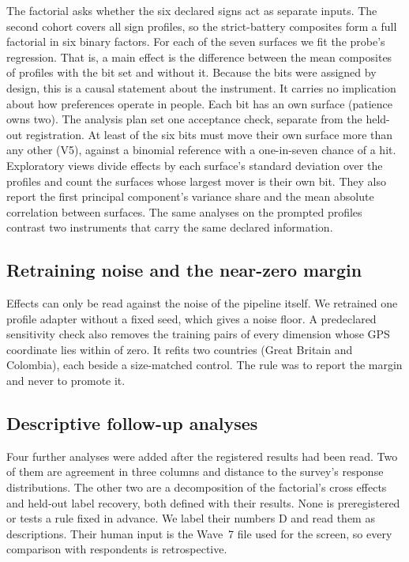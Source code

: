 The factorial asks whether the six declared signs act as separate inputs. The second cohort covers all  sign profiles, so the strict-battery composites form a full factorial in six binary factors. For each of the seven surfaces we fit the probe's regression. That is, a main effect is the difference between the mean composites of profiles with the bit set and without it. Because the bits were assigned by design, this is a causal statement about the instrument. It carries no implication about how preferences operate in people. Each bit has an own surface (patience owns two). The analysis plan set one acceptance check, separate from the held-out registration. At least  of the six bits must move their own surface more than any other (V5), against a binomial reference with a one-in-seven chance of a hit. Exploratory views divide effects by each surface's standard deviation over the  profiles and count the surfaces whose largest mover is their own bit. They also report the first principal component's variance share and the mean absolute correlation between surfaces. The same analyses on the  prompted profiles contrast two instruments that carry the same declared information.

\subsection{Retraining noise and the near-zero margin}\label{sec:design-noise}

Effects can only be read against the noise of the pipeline itself. We retrained one profile adapter without a fixed seed, which gives a noise floor. A predeclared sensitivity check also removes the training pairs of every dimension whose GPS coordinate lies within  of zero. It refits two countries (Great Britain and Colombia), each beside a size-matched control. The rule was to report the margin and never to promote it.

\subsection{Descriptive follow-up analyses}\label{sec:design-desc}

Four further analyses were added after the registered results had been read. Two of them are agreement in three columns and distance to the survey's response distributions. The other two are a decomposition of the factorial's cross effects and held-out label recovery, both defined with their results. None is preregistered or tests a rule fixed in advance. We label their numbers D and read them as descriptions. Their human input is the Wave~7 file used for the screen, so every comparison with respondents is retrospective.

